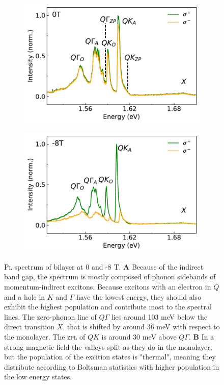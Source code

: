 \begin{figure}[t]
	\begin{subfigure}{0.49\textwidth}
		\caption{}
		\includegraphics[height=0.65\textwidth]{bilayer_0T}
	\end{subfigure}
	\begin{subfigure}{0.49\textwidth}
		\caption{}
		\includegraphics[height=0.65\textwidth]{bilayer_-8T}
	\end{subfigure}
	\caption{\textsc{Pl} spectrum of bilayer \wse at 0 and -8 T. \textbf{A} Because of the indirect band gap, the \pl spectrum is mostly composed of phonon sidebands of momentum-indirect excitons. Because excitons with an electron in $Q$ and a hole in $K$ and $\Gamma$ have the lowest energy, they should also exhibit the highest population and contribute most to the spectral lines. The zero-phonon line of $Q\Gamma$ lies around 103 meV below the direct transition $X$, that is shifted by around 36 meV with respect to the monolayer. The \textsc{zpl} of $QK$ is around 30 meV above $Q\Gamma$. \textbf{B} In a strong magnetic field the valleys split as they do in the monolayer, but the population of the excition states is "thermal", meaning they distribute according to Boltsman statistics with higher population in the low energy states.} 
	\label{bilayerthermal}
\end{figure}

